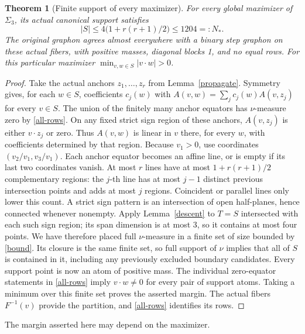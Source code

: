 \documentclass[11pt]{article}
\newtheorem{theorem}{Theorem}[section]
\theoremstyle{remark}\newtheorem{remark}[theorem]{Remark}
\numberwithin{equation}{section}
\begin{document}
\begin{theorem}[Finite support of every maximizer]\label{finite}
For every global maximizer of $\Sigma_3$, its actual canonical support satisfies
\begin{equation}
 |S|\le 4\bigl(1+r(r+1)/2\bigr)\le1204=:N_*. \label{bound}
\end{equation}
The original graphon agrees almost everywhere with a binary step graphon
on these actual fibers, with
positive masses, diagonal blocks 1, and no equal rows. For this particular
maximizer $\min_{v,w\in S}|v\cdot w|>0$.
\end{theorem}
\begin{proof}
Take the actual anchors $z_1,\ldots,z_r$ from Lemma~\ref{propagate}.
Symmetry gives, for each $w\in S$, coefficients $c_j(w)$ with
$A(v,w)=\sum_j c_j(w)A(v,z_j)$ for every $v\in S$.
The union of the finitely many anchor equators has $\nu$-measure zero by \eqref{all-rows}.
On any fixed strict sign region of these anchors,
$A(v,z_j)$ is either $v\cdot z_j$ or zero. Thus $A(v,w)$ is linear in $v$
there, for every $w$, with coefficients determined by that region.
Because $v_1>0$, use coordinates $(v_2/v_1,v_3/v_1)$.
Each anchor equator becomes an affine line, or is empty if its last two coordinates vanish.
At most $r$ lines have at most $1+r(r+1)/2$ complementary regions: the $j$-th
line has at most $j-1$ distinct previous intersection points and adds at most $j$ regions.
Coincident or parallel lines only lower this count. A strict sign pattern is an
intersection of open half-planes, hence connected whenever nonempty.
Apply Lemma~\ref{descent} to $T=S$ intersected with each such sign region;
its span dimension is at most 3, so it contains at most four points.
We have therefore placed full $\nu$-measure in a finite set of size bounded by \eqref{bound}.
Its closure is the same finite set, so full support of $\nu$ implies that all of $S$
is contained in it, including any previously excluded boundary candidates.
Every support point is now an atom of positive mass. The individual zero-equator
statements in \eqref{all-rows} imply $v\cdot w\ne0$ for every pair of support atoms.
Taking a minimum over this finite set proves the asserted margin.
The actual fibers $F^{-1}(v)$ provide the partition, and \eqref{all-rows} identifies its rows.
\end{proof}
The margin asserted here may depend on the maximizer.
\end{document}

